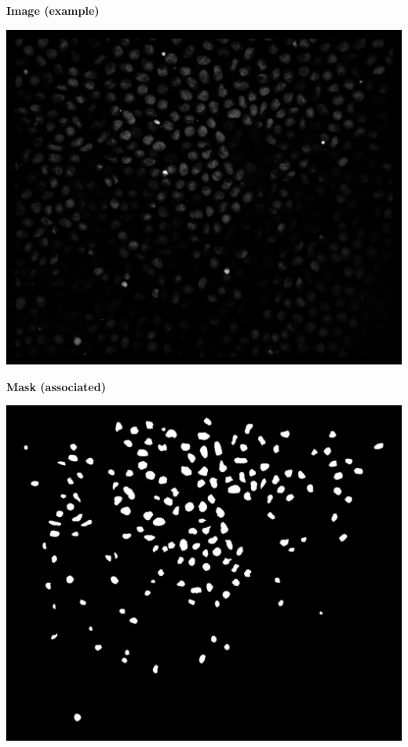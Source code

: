 \subsection{\slidetitle}
\begin{frame}
  \frametitle{\sectiontitle}
  \framesubtitle{\slidetitle}

  \begin{minipage}[h!]{0.30\textwidth}
    \centering
    \textbf{Image (example)}\par\medskip
    \includegraphics[scale=0.1]{./img/result_img.png}
  \end{minipage}\hfill
  \begin{minipage}[h!]{0.30\textwidth}
    \centering
    \textbf{Mask (associated)}\par\medskip
    \includegraphics[scale=0.1]{./img/result_mask.png}

\end{minipage}
\end{frame}
